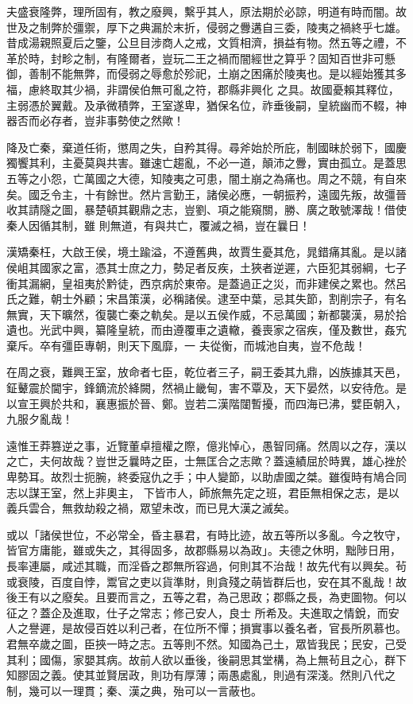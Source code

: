\begin{pinyinscope}
 夫盛衰隆弊，理所固有，教之廢興，繫乎其人，原法期於必諒，明道有時而闇。故世及之制弊於彊禦，厚下之典漏於末折，侵弱之釁遘自三委，陵夷之禍終乎七雄。昔成湯親照夏后之鑒，公旦目涉商人之戒，文質相濟，損益有物。然五等之禮，不革於時，封畛之制，有隆爾者，豈玩二王之禍而闇經世之算乎？固知百世非可懸御，善制不能無弊，而侵弱之辱愈於殄祀，土崩之困痛於陵夷也。是以經始獲其多福，慮終取其少禍，非謂侯伯無可亂之符，郡縣非興化
 之具。故國憂賴其釋位，主弱憑於翼戴。及承微積弊，王室遂卑，猶保名位，祚垂後嗣，皇統幽而不輟，神器否而必存者，豈非事勢使之然歟！



 降及亡秦，棄道任術，懲周之失，自矜其得。尋斧始於所庇，制國昧於弱下，國慶獨饗其利，主憂莫與共害。雖速亡趨亂，不必一道，顛沛之釁，實由孤立。是蓋思五等之小怨，亡萬國之大德，知陵夷之可患，闇土崩之為痛也。周之不競，有自來矣。國乏令主，十有餘世。然片言勤王，諸侯必應，一朝振矜，遠國先叛，故彊晉收其請隧之圖，暴楚頓其觀鼎之志，豈劉、項之能窺關，勝、廣之敢號澤哉！借使秦人因循其制，雖
 則無道，有與共亡，覆滅之禍，豈在曩日！



 漢矯秦枉，大啟王侯，境土踰溢，不遵舊典，故賈生憂其危，晁錯痛其亂。是以諸侯岨其國家之富，憑其士庶之力，勢足者反疾，土狹者逆遲，六臣犯其弱綱，七子衝其漏網，皇祖夷於黔徒，西京病於東帝。是蓋過正之災，而非建侯之累也。然呂氏之難，朝士外顧；宋昌策漢，必稱諸侯。逮至中葉，忌其失節，割削宗子，有名無實，天下曠然，復襲亡秦之軌矣。是以五侯作威，不忌萬國；新都襲漢，易於拾遺也。光武中興，纂隆皇統，而由遵覆車之遺轍，養喪家之宿疾，僅及數世，姦宄棄斥。卒有彊臣專朝，則天下風靡，一
 夫從衡，而城池自夷，豈不危哉！



 在周之衰，難興王室，放命者七臣，乾位者三子，嗣王委其九鼎，凶族據其天邑，鉦鼙震於閫宇，鋒鏑流於絳闕，然禍止畿甸，害不覃及，天下晏然，以安待危。是以宣王興於共和，襄惠振於晉、鄭。豈若二漢階闥暫擾，而四海已沸，嬖臣朝入，九服夕亂哉！



 遠惟王莽篡逆之事，近覽董卓擅權之際，億兆悼心，愚智同痛。然周以之存，漢以之亡，夫何故哉？豈世乏曩時之臣，士無匡合之志歟？蓋遠績屈於時異，雄心挫於卑勢耳。故烈士扼腕，終委寇仇之手；中人變節，以助虐國之桀。雖復時有鳩合同志以謀王室，然上非奧主，
 下皆市人，師旅無先定之班，君臣無相保之志，是以義兵雲合，無救劫殺之禍，眾望未改，而已見大漢之滅矣。



 或以「諸侯世位，不必常全，昏主暴君，有時比迹，故五等所以多亂。今之牧守，皆官方庸能，雖或失之，其得固多，故郡縣易以為政」。夫德之休明，黜陟日用，長率連屬，咸述其職，而淫昏之郡無所容過，何則其不治哉！故先代有以興矣。茍或衰陵，百度自悖，鬻官之吏以貨準財，則貪殘之萌皆群后也，安在其不亂哉！故後王有以之廢矣。且要而言之，五等之君，為己思政；郡縣之長，為吏圖物。何以征之？蓋企及進取，仕子之常志；修己安人，良士
 所希及。夫進取之情銳，而安人之譽遲，是故侵百姓以利己者，在位所不憚；損實事以養名者，官長所夙慕也。君無卒歲之圖，臣挾一時之志。五等則不然。知國為己土，眾皆我民；民安，己受其利；國傷，家嬰其病。故前人欲以垂後，後嗣思其堂構，為上無茍且之心，群下知膠固之義。使其並賢居政，則功有厚薄；兩愚處亂，則過有深淺。然則八代之制，幾可以一理貫；秦、漢之典，殆可以一言蔽也。




\end{pinyinscope}
